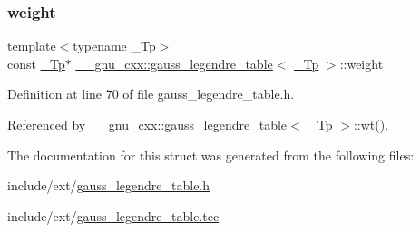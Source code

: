 \subsubsection{\texorpdfstring{weight}{weight}}
{\footnotesize\ttfamily template$<$typename \+\_\+\+Tp$>$ \\
const \hyperlink{namespace____gnu__cxx_a3b19a9c800ca194374ef9172290f7d79}{\+\_\+\+Tp}$\ast$ \hyperlink{struct____gnu__cxx_1_1gauss__legendre__table}{\+\_\+\+\_\+gnu\+\_\+cxx\+::gauss\+\_\+legendre\+\_\+table}$<$ \hyperlink{namespace____gnu__cxx_a3b19a9c800ca194374ef9172290f7d79}{\+\_\+\+Tp} $>$\+::weight}



Definition at line 70 of file gauss\+\_\+legendre\+\_\+table.\+h.



Referenced by \+\_\+\+\_\+gnu\+\_\+cxx\+::gauss\+\_\+legendre\+\_\+table$<$ \+\_\+\+Tp $>$\+::wt().



The documentation for this struct was generated from the following files\+:\begin{DoxyCompactItemize}
\item 
include/ext/\hyperlink{gauss__legendre__table_8h}{gauss\+\_\+legendre\+\_\+table.\+h}\item 
include/ext/\hyperlink{gauss__legendre__table_8tcc}{gauss\+\_\+legendre\+\_\+table.\+tcc}\end{DoxyCompactItemize}
